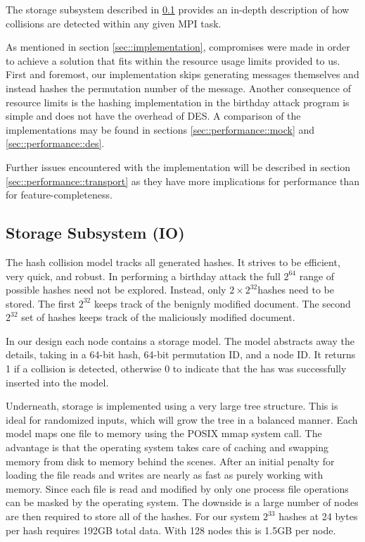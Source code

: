 The storage subsystem described in \ref{sec::implementation::storage} provides
an in-depth description of how collisions are detected within any given MPI
task.

As mentioned in section \ref{sec::implementation}, compromises were made in
order to achieve a solution that fits within the resource usage limits provided
to us.  First and foremost, our implementation skips generating messages
themselves and instead hashes the permutation number of the message.  Another
consequence of resource limits is the hashing implementation in the birthday
attack program is simple and does not have the overhead of DES.  A comparison of
the implementations may be found in sections \ref{sec::performance::mock} and 
\ref{sec::performance::des}.

Further issues encountered with the implementation will be described in section
\ref{sec::performance::transport} as they have more implications for performance
than for feature-completeness.

\subsection{Storage Subsystem (IO)}
\label{sec::implementation::storage}
The hash collision model tracks all generated hashes. It strives to be efficient,
very quick, and robust. In performing a birthday attack the full $2^{64}$ range of
possible hashes need not be explored. Instead,  only $2 \times 2^{32}$hashes need
to be stored. The first $2^{32}$ keeps track of the benignly modified document.
The second $2^{32}$ set of hashes keeps track of the maliciously modified document.

In our design each node contains a storage model. The model abstracts away the details, taking
in a 64-bit hash, 64-bit permutation ID, and a node ID. It returns 1 if a collision is detected,
otherwise 0 to indicate that the has was successfully inserted into the model. 

Underneath, storage is implemented using a very large tree structure. This is ideal for randomized inputs,
which will grow the tree in a balanced manner. Each model maps one file to memory using the POSIX mmap 
system call. The advantage is that the operating system takes care of caching and swapping memory from disk 
to memory behind the scenes. After an initial penalty for loading the file reads and writes are nearly as fast
as purely working with memory. Since each file is read and modified by only one process file operations can be
masked by the operating system. The downside is a large number of nodes are then required to
store all of the hashes. For our system $2^{33}$ hashes at 24 bytes per hash requires 192GB total data.
With 128 nodes this is 1.5GB per node.


